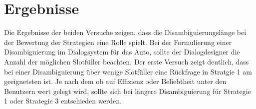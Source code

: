 \documentclass[12pt,a4paper]{scrartcl}
\begin{document}
\section{Ergebnisse}
\label{Ergebnisse}

Die Ergebnisse der beiden Versuche zeigen, dass die Disambiguierungslänge bei der Bewertung der Strategien eine Rolle spielt. Bei der Formulierung einer Disambiguierung im Dialogsystem für das Auto, sollte der Dialogdesigner die Anzahl der möglichen Slotfüller beachten. Der erste Versuch zeigt deutlich, dass bei einer Disambiguierung über wenige Slotfüller eine Rückfrage in Stratgie 1 am geeignetsten ist. Je nach dem ob auf Effizienz oder Beliebtheit unter den Benutzern wert gelegt wird, sollte sich bei längere Disambiguierung für Strategie 1 oder Strategie 3 entschieden werden. 
\end{document}
